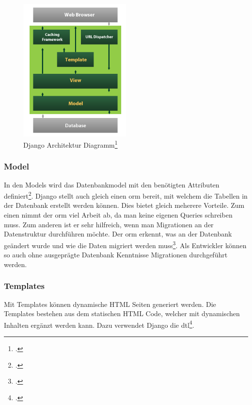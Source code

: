 \begin{figure}[H]
	\begin{center}	
		\includegraphics[width=0.5\textwidth, keepaspectratio]{images/django_mtv.png}
		\caption{Django Architektur Diagramm\footcite{django_architektur_image}}
			\label{django_architecture}
	\end{center}
\end{figure}

\subsubsection*{Model}
In den Models wird das Datenbankmodel mit den benötigten Attributen definiert\footcite{django_models}. Django stellt auch gleich einen \gls{orm} bereit, mit welchem die Tabellen in der Datenbank erstellt werden können. Dies bietet gleich meherere Vorteile. Zum einen nimmt der \gls{orm} viel Arbeit ab, da man keine eigenen Queries schreiben muss. Zum anderen ist er sehr hilfreich, wenn man Migrationen an der Datenstruktur durchführen möchte. Der \gls{orm} erkennt, was an der Datenbank geändert wurde und wie die Daten migriert werden muss\footcite{django_manage}. Als Entwickler können so auch ohne ausgeprägte Datenbank Kenntnisse Migrationen durchgeführt werden.

\subsubsection*{Templates}
Mit Templates können dynamische HTML Seiten generiert werden. Die Templates bestehen aus dem statischen HTML Code, welcher mit dynamischen Inhalten ergänzt werden kann.  Dazu verwendet Django die \gls{dtl}\footcite{django_templates}.


